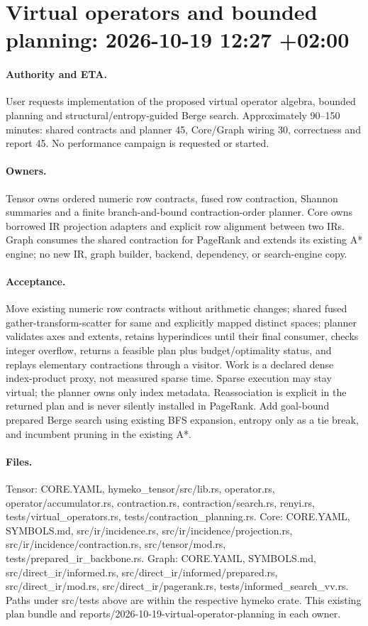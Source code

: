 \documentclass[11pt,a4paper]{article}
\begin{document}
\clearpage
\section*{Virtual operators and bounded planning: 2026-10-19 12:27 +02:00}
\paragraph{Authority and ETA.} User requests implementation of the proposed virtual
operator algebra, bounded planning and structural/entropy-guided Berge search.
Approximately 90--150 minutes: shared contracts and planner 45, Core/Graph wiring 30,
correctness and report 45. No performance campaign is requested or started.
\paragraph{Owners.} Tensor owns ordered numeric row contracts, fused row contraction,
Shannon summaries and a finite branch-and-bound contraction-order planner. Core owns
borrowed IR projection adapters and explicit row alignment between two IRs. Graph
consumes the shared contraction for PageRank and extends its existing A* engine;
no new IR, graph builder, backend, dependency, or search-engine copy.
\paragraph{Acceptance.} Move existing numeric row contracts without arithmetic changes;
shared fused gather-transform-scatter for same and explicitly mapped distinct spaces;
planner validates axes and extents, retains hyperindices until their final consumer,
checks integer overflow, returns a feasible plan plus budget/optimality status, and
replays elementary contractions through a visitor. Work is a declared dense index-product
proxy, not measured sparse time. Sparse execution may stay virtual; the planner owns
only index metadata. Reassociation is explicit in the returned plan and is never
silently installed in PageRank. Add goal-bound prepared Berge search using existing
BFS expansion, entropy only as a tie break, and incumbent pruning in the existing A*.
\paragraph{Files.} Tensor: CORE.YAML, hymeko\_tensor/src/lib.rs,
operator.rs, operator/accumulator.rs, contraction.rs, contraction/search.rs,
renyi.rs, tests/virtual\_operators.rs, tests/contraction\_planning.rs.
Core: CORE.YAML, SYMBOLS.md, src/ir/incidence.rs, src/ir/incidence/projection.rs,
src/ir/incidence/contraction.rs, src/tensor/mod.rs, tests/prepared\_ir\_backbone.rs.
Graph: CORE.YAML, SYMBOLS.md, src/direct\_ir/informed.rs,
src/direct\_ir/informed/prepared.rs, src/direct\_ir/mod.rs,
src/direct\_ir/pagerank.rs, tests/informed\_search\_vv.rs.
Paths under src/tests above are within the respective hymeko crate.
This existing plan bundle and reports/2026-10-19-virtual-operator-planning in each owner.
\end{document}
